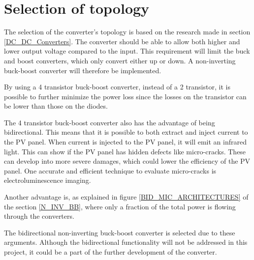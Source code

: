 \section{Selection of topology}
The selection of the converter's topology is based on the research made in section \ref{DC_DC_Converters}. The converter should be able to allow both higher and lower output voltage compared to the input. This requirement will limit the buck and boost converters, which only convert either up or down. A non-inverting buck-boost converter will therefore be implemented.

By using a 4 transistor buck-boost converter, instead of a 2 transistor, it is possible to further minimize the power loss since the losses on the transistor can be lower than those on the diodes.

The 4 transistor buck-boost converter also has the advantage of being bidirectional. This means that it is possible to both extract and inject current to the PV panel. When current is injected to the PV panel, it will emit an infrared light. This can show if the PV panel has hidden defects like micro-cracks. These can develop into more severe damages, which could lower the efficiency of the PV panel. One accurate and efficient technique to evaluate micro-cracks is electroluminescence imaging. \cite{Electroluminescence}




Another advantage is, as explained in figure \ref{BID_MIC_ARCHITECTURES} of the section \ref{N_INV_BB}, where only a fraction of the total power is flowing through the converters.

The bidirectional non-inverting buck-boost converter is selected due to these arguments. Although the bidirectional functionality will not be addressed in this project, it could be a part of the further development of the converter. 






 